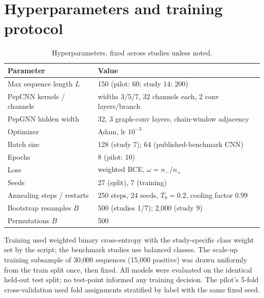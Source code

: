 \appendix
\section{Hyperparameters and training protocol}\label{app:hyper}
\begin{table}[h]\centering\caption{Hyperparameters, fixed across studies unless noted.}
\begin{tabular}{ll}\hline
Parameter & Value \\ \hline
Max sequence length $L$ & 150 (pilot: 60; study 14: 200) \\
PepCNN kernels / channels & widths 3/5/7, 32 channels each, 2 conv layers/branch \\
PepGNN hidden width & 32, 3 graph-conv layers, chain-window adjacency \\
Optimizer & Adam, lr $10^{-3}$ \\
Batch size & 128 (study 7); 64 (published-benchmark CNN) \\
Epochs & 8 (pilot: 10) \\
Loss & weighted BCE, $\omega = n_-/n_+$ \\
Seeds & 27 (split), 7 (training) \\
Annealing steps / restarts & 250 steps, 24 seeds, $T_0=0.2$, cooling factor 0.99 \\
Bootstrap resamples $B$ & 500 (studies 1/7); 2{,}000 (study 9) \\
Permutations $B$ & 500 \\
\hline\end{tabular}\end{table}

Training used weighted binary cross-entropy with the study-specific class
weight set by the script; the benchmark studies use balanced classes. The scale-up
training subsample of 30{,}000 sequences (15{,}000 positive) was drawn
uniformly from the train split once, then fixed. All models were evaluated on
the identical held-out test split; no test-point informed any training
decision. The pilot's 5-fold cross-validation used fold assignments stratified
by label with the same fixed seed.

